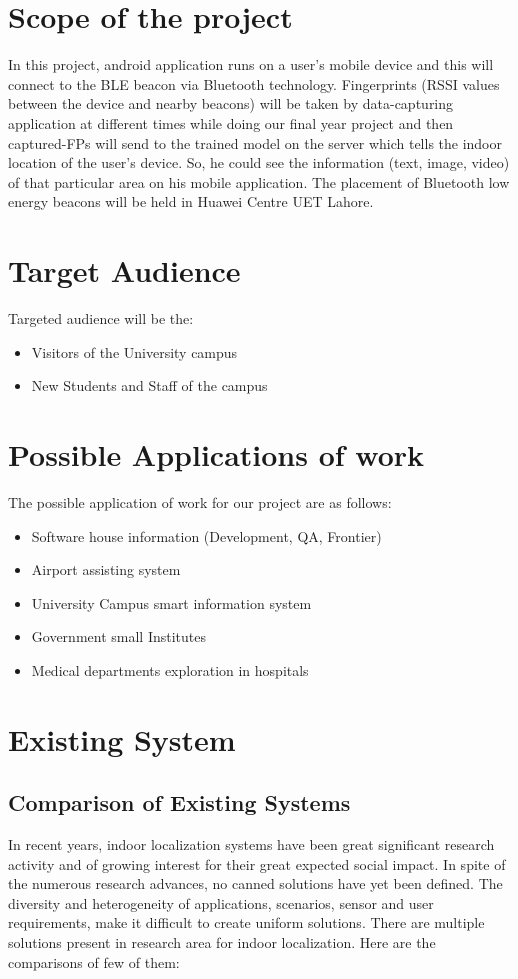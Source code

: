 \documentclass{article}
\begin{document}
\section{Scope of the project}
In this project, android application runs on a user’s mobile device and this will connect to the BLE beacon via Bluetooth technology. Fingerprints (RSSI values between the device and nearby beacons) will be taken by data-capturing application at different times while doing our final year project and then captured-FPs will send to the trained model on the server which tells the indoor location of the user’s device.\cite{lLoco} So, he could see the information (text, image, video) of that particular area on his mobile application. The placement of Bluetooth low energy beacons will be held in Huawei Centre UET Lahore. 

\section{Target Audience}
Targeted audience will be the:
\begin{itemize}
\item Visitors of the University campus 
\item New Students and Staff of the campus
\end{itemize}



\section{Possible Applications of work}
The possible application of work for our project are as follows:


\begin{itemize}
\item Software house information (Development, QA, Frontier)
\item Airport assisting system
\item University Campus smart information system
\item Government small Institutes
\item Medical departments exploration in hospitals
\end{itemize}

\section{Existing System}
\subsection{Comparison of Existing Systems}
In recent years, indoor localization systems have been great significant research activity and of growing interest for their great expected social impact. In spite of the numerous research advances, no canned solutions have yet been defined. The diversity and heterogeneity of applications, scenarios, sensor and user requirements, make it difficult to create uniform solutions. There are multiple solutions present in research area for indoor localization. Here are the comparisons of few of them:
\end{document}
